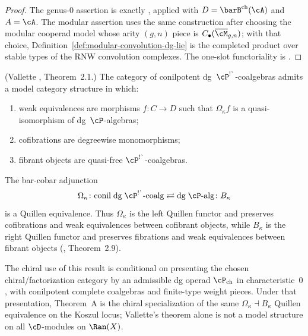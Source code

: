 \begin{proof}
The genus-$0$ assertion is exactly
\cite[Theorem~4.6]{RNW19}, applied with
$D=\barB^{\mathrm{ch}}(\cA)$ and $A=\cA$. The modular assertion
uses the same construction after choosing the modular cooperad
model whose arity $(g,n)$ piece is
$C_\bullet(\overline{\cM}_{g,n})$; with that choice,
Definition~\ref{def:modular-convolution-dg-lie} is the completed
product over stable types of the RNW convolution complexes.
The one-slot functoriality is \cite[Corollary~5.4]{RNW19}.
\end{proof}

\begin{corollary}
\label{cor:quillen-equivalence-chiral}%
%
%
\textup{(Vallette \cite{Val16}, Theorem~2.1.)}
The category of conilpotent dg~$\cP^{\scriptstyle\textrm{!\`{}}}$-coalgebras
admits a model category structure in which:
\begin{enumerate}[label=\textup{(\roman*)}]
\item weak equivalences are morphisms $f\colon C \to D$ such that
 $\Omega_\kappa f$ is a quasi-isomorphism of dg~$\cP$-algebras;
\item cofibrations are degreewise monomorphisms;
\item fibrant objects are quasi-free
 $\cP^{\scriptstyle\textrm{!\`{}}}$-coalgebras.
\end{enumerate}
The bar-cobar adjunction
\[
\Omega_\kappa \colon
\mathrm{conil}\;\mathrm{dg}\;\cP^{\scriptstyle\textrm{!\`{}}}\text{-coalg}
\rightleftarrows
\mathrm{dg}\;\cP\text{-alg}
\colon B_\kappa
\]
is a Quillen equivalence. Thus $\Omega_\kappa$ is the left
Quillen functor and preserves cofibrations and weak equivalences
between cofibrant objects, while $B_\kappa$ is the right Quillen
functor and preserves fibrations and weak equivalences between
fibrant objects
\textup{(\cite{Val16}, Theorem~2.9)}.

The chiral use of this result is conditional on presenting the
chosen chiral/factorization category by an admissible dg operad
$\cP_{\mathrm{ch}}$ in characteristic~$0$, with conilpotent
complete coalgebras and finite-type weight pieces. Under that
presentation, Theorem~A is the chiral specialization of the
same $\Omega_\kappa \dashv B_\kappa$ Quillen equivalence on the
Koszul locus; Vallette's theorem alone is not a model structure
on all $\cD$-modules on $\Ran(X)$.
\end{corollary}

